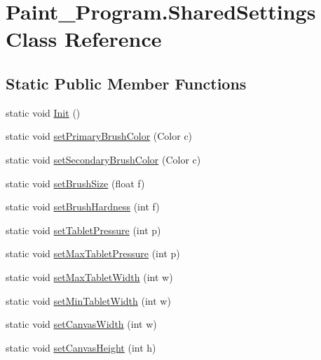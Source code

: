 \hypertarget{class_paint___program_1_1_shared_settings}{}\section{Paint\+\_\+\+Program.\+Shared\+Settings Class Reference}
\label{class_paint___program_1_1_shared_settings}
\subsection*{Static Public Member Functions}
\begin{DoxyCompactItemize}
\item 
static void \mbox{\hyperlink{class_paint___program_1_1_shared_settings_a9f6a2a6df595862f69d7e44a5e71f3df}{Init}} ()
\item 
static void \mbox{\hyperlink{class_paint___program_1_1_shared_settings_a338aee99adec43263865efd72d3047d8}{set\+Primary\+Brush\+Color}} (Color c)
\item 
static void \mbox{\hyperlink{class_paint___program_1_1_shared_settings_a03d6ad1b2c1d8074f5148cc4d437eb34}{set\+Secondary\+Brush\+Color}} (Color c)
\item 
static void \mbox{\hyperlink{class_paint___program_1_1_shared_settings_a99ba49acce27e525b661fe753767d4c4}{set\+Brush\+Size}} (float f)
\item 
static void \mbox{\hyperlink{class_paint___program_1_1_shared_settings_ae853cb08537d7a62bb0e27506df73b8c}{set\+Brush\+Hardness}} (int f)
\item 
static void \mbox{\hyperlink{class_paint___program_1_1_shared_settings_a6876774d8860f1fe998af8ad11c67fa4}{set\+Tablet\+Pressure}} (int p)
\item 
static void \mbox{\hyperlink{class_paint___program_1_1_shared_settings_aee4a7cb8a005ebba8d7bb04bcb88fc5d}{set\+Max\+Tablet\+Pressure}} (int p)
\item 
static void \mbox{\hyperlink{class_paint___program_1_1_shared_settings_a42253f0a22109eb5f6c9f5208cb980aa}{set\+Max\+Tablet\+Width}} (int w)
\item 
static void \mbox{\hyperlink{class_paint___program_1_1_shared_settings_a51651e5540d6d199888744b1d2dbb21f}{set\+Min\+Tablet\+Width}} (int w)
\item 
static void \mbox{\hyperlink{class_paint___program_1_1_shared_settings_ae7b448227769e4c55522c80a3d6592e6}{set\+Canvas\+Width}} (int w)
\item 
static void \mbox{\hyperlink{class_paint___program_1_1_shared_settings_a648746ef4bcf9bfea2b97ba8d3dca8f4}{set\+Canvas\+Height}} (int h)

\end{DoxyCompactItemize}

